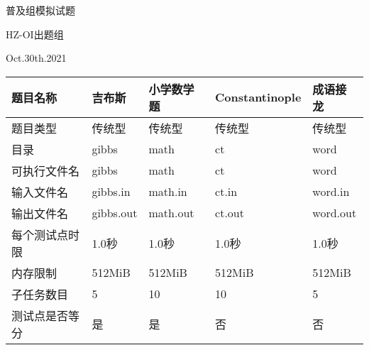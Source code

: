 \documentclass[final,11pt,oneside,UTF8]{report}
\begin{document}
\centerline{\LARGE{普及组模拟试题}}
\centerline{}
\centerline{\LARGE{HZ-OI出题组}}
\centerline{}
\centerline{\LARGE{Oct.30th.2021}}
\centerline{}
\begin{table}[h]
    \centering
    \begin{tabular}{lllll}
        \hline
        \multicolumn{1}{|l|}{题目名称}       & \multicolumn{1}{l|}{吉布斯}    & \multicolumn{1}{l|}{小学数学题} & \multicolumn{1}{l|}{Constantinople} & \multicolumn{1}{l|}{成语接龙} \\ \hline
        \multicolumn{1}{|l|}{题目类型}       & \multicolumn{1}{l|}{传统型}    & \multicolumn{1}{l|}{传统型}     & \multicolumn{1}{l|}{传统型}         & \multicolumn{1}{l|}{传统型}   \\ \hline
        \multicolumn{1}{|l|}{目录}           & \multicolumn{1}{l|}{gibbs}     & \multicolumn{1}{l|}{math}       & \multicolumn{1}{l|}{ct}             & \multicolumn{1}{l|}{word}     \\ \hline
        \multicolumn{1}{|l|}{可执行文件名}   & \multicolumn{1}{l|}{gibbs}     & \multicolumn{1}{l|}{math}       & \multicolumn{1}{l|}{ct}             & \multicolumn{1}{l|}{word}     \\ \hline
        \multicolumn{1}{|l|}{输入文件名}     & \multicolumn{1}{l|}{gibbs.in}  & \multicolumn{1}{l|}{math.in}    & \multicolumn{1}{l|}{ct.in}          & \multicolumn{1}{l|}{word.in}  \\ \hline
        \multicolumn{1}{|l|}{输出文件名}     & \multicolumn{1}{l|}{gibbs.out} & \multicolumn{1}{l|}{math.out}   & \multicolumn{1}{l|}{ct.out}         & \multicolumn{1}{l|}{word.out} \\ \hline
        \multicolumn{1}{|l|}{每个测试点时限} & \multicolumn{1}{l|}{1.0秒}     & \multicolumn{1}{l|}{1.0秒}      & \multicolumn{1}{l|}{1.0秒}          & \multicolumn{1}{l|}{1.0秒}    \\ \hline
        \multicolumn{1}{|l|}{内存限制}       & \multicolumn{1}{l|}{512MiB}    & \multicolumn{1}{l|}{512MiB}     & \multicolumn{1}{l|}{512MiB}         & \multicolumn{1}{l|}{512MiB}   \\ \hline
        \multicolumn{1}{|l|}{子任务数目}     & \multicolumn{1}{l|}{5}         & \multicolumn{1}{l|}{10}         & \multicolumn{1}{l|}{10}             & \multicolumn{1}{l|}{5}        \\ \hline
        \multicolumn{1}{|l|}{测试点是否等分} & \multicolumn{1}{l|}{是}        & \multicolumn{1}{l|}{是}         & \multicolumn{1}{l|}{否}             & \multicolumn{1}{l|}{否}       \\ \hline

\end{tabular}
\end{table}
\end{document}
